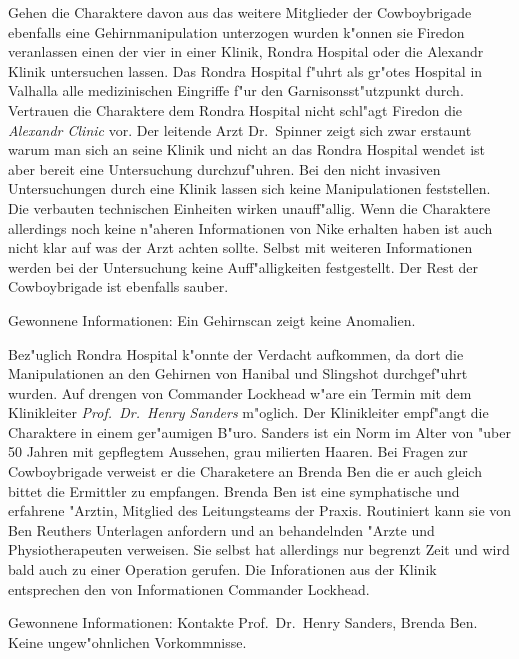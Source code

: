 
Gehen die Charaktere davon aus das weitere Mitglieder der Cowboybrigade ebenfalls eine Gehirnmanipulation unterzogen wurden k"onnen sie Firedon veranlassen einen der vier in einer Klinik, Rondra Hospital oder die Alexandr Klinik untersuchen lassen. Das Rondra Hospital f"uhrt als gr"o\3tes Hospital in Valhalla alle medizinischen Eingriffe f"ur den Garnisonsst"utzpunkt durch. Vertrauen die Charaktere dem Rondra Hospital nicht schl"agt Firedon die \emph{Alexandr Clinic} vor. Der leitende Arzt Dr.~Spinner zeigt sich zwar erstaunt warum man sich an seine Klinik und nicht an das Rondra Hospital wendet ist aber bereit eine Untersuchung durchzuf"uhren. Bei den nicht invasiven Untersuchungen durch eine Klinik lassen sich keine Manipulationen feststellen. Die verbauten technischen Einheiten wirken unauff"allig. Wenn die Charaktere allerdings noch keine n"aheren Informationen von Nike erhalten haben ist auch nicht klar auf was der Arzt achten sollte. Selbst mit weiteren Informationen werden bei der Untersuchung keine Auff"alligkeiten festgestellt. Der Rest der Cowboybrigade ist ebenfalls sauber.

\begin{remarks}
	Gewonnene Informationen: Ein Gehirnscan zeigt keine Anomalien.
\end{remarks}



Bez"uglich Rondra Hospital k"onnte der Verdacht aufkommen, da\3 dort die Manipulationen an den Gehirnen von Hanibal und Slingshot durchgef"uhrt wurden. Auf drengen von Commander Lockhead w"are ein Termin mit dem Klinikleiter \emph{Prof.~Dr.~Henry Sanders} m"oglich. Der Klinikleiter empf"angt die Charaktere in einem ger"aumigen B"uro. Sanders ist ein Norm im Alter von "uber 50 Jahren mit gepflegtem Aussehen, grau milierten Haaren. Bei Fragen zur Cowboybrigade verweist er die Charaketere an Brenda Ben die er auch gleich bittet die Ermittler zu empfangen. Brenda Ben ist eine symphatische und erfahrene "Arztin, Mitglied des Leitungsteams der Praxis. Routiniert kann sie von Ben Reuthers Unterlagen anfordern und an behandelnden "Arzte und Physiotherapeuten verweisen. Sie selbst hat allerdings nur begrenzt Zeit und wird bald auch zu einer Operation gerufen. Die Inforationen aus der Klinik entsprechen den von Informationen Commander Lockhead.

\begin{remarks}
	Gewonnene Informationen: Kontakte Prof.~Dr.~Henry Sanders, Brenda Ben. Keine ungew"ohnlichen Vorkommnisse.
\end{remarks}


